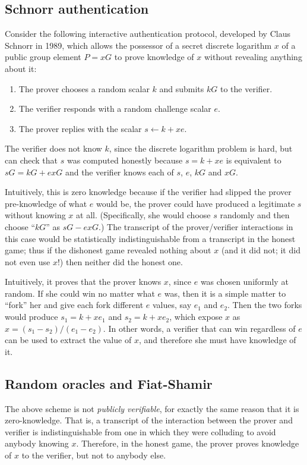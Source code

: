 \documentclass[letterpaper]{article}
\begin{document}
\subsection{Schnorr authentication}
Consider the following interactive authentication protocol, developed by Claus
Schnorr in 1989\cite{schnorr1989}, which allows the possessor of a secret discrete
logarithm $x$ of a public group element $P=xG$ to prove knowledge of $x$ without
revealing anything about it:
\begin{enumerate}
\item The prover chooses a random scalar $k$ and submits $kG$ to the verifier.
\item The verifier responds with a random challenge scalar $e$.
\item The prover replies with the scalar $s\gets k + xe$.
\end{enumerate}
The verifier does not know $k$, since the discrete logarithm problem is hard,
but can check that $s$ was computed honestly because $s = k + xe$ is equivalent
to $sG = kG + exG$ and the verifier knows each of $s$, $e$, $kG$ and $xG$.

Intuitively, this is zero knowledge because if the verifier had slipped the
prover pre-knowledge of what $e$ would be, the prover could have produced a
legitimate $s$ without knowing $x$ at all. (Specifically, she would choose
$s$ randomly and then choose ``$kG$'' as $sG - exG$.) The transcript of the
prover/verifier interactions in this case would be statistically indistinguishable
from a transcript in the honest game; thus if the dishonest game revealed
nothing about $x$ (and it did not; it did not even use $x$!) then neither did
the honest one.

Intuitively, it proves that the prover knows $x$, since $e$ was chosen uniformly
at random. If she could win no matter what $e$ was, then it is a simple matter to
``fork'' her and give each fork different $e$ values, say $e_1$ and $e_2$. Then
the two forks would produce $s_1 = k + xe_1$ and $s_2 = k + xe_2$, which expose
$x$ as $x = (s_1 - s_2)/(e_1 - e_2)$. In other words, a verifier that can win
regardless of $e$ can be used to extract the value of $x$, and therefore she must
have knowledge of it.

\subsection{Random oracles and Fiat-Shamir}

The above scheme is not \emph{publicly verifiable}, for exactly the same reason
that it is zero-knowledge. That is, a transcript of the interaction between the
prover and verifier is indistinguishable from one in which they were colluding
to avoid anybody knowing $x$. Therefore, in the honest game, the prover proves
knowledge of $x$ to the verifier, but not to anybody else.
\end{document}
